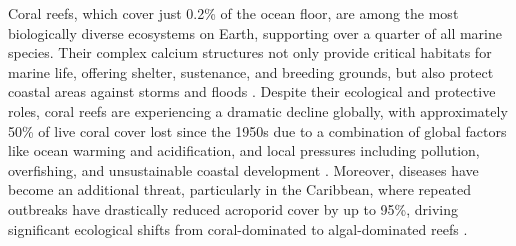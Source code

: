 \documentclass[preprint,12pt,authoryear]{elsarticle}
\begin{document}
Coral reefs, which cover just 0.2\% of the ocean floor, are among the most biologically diverse ecosystems on Earth, supporting over a quarter of all marine species. Their complex calcium structures not only provide critical habitats for marine life, offering shelter, sustenance, and breeding grounds, but also protect coastal areas against storms and floods \citep{Moberg1999, Spalding1997, Rogers2014May, Ferrario2014, Elliff2017Jun}. Despite their ecological and protective roles, coral reefs are experiencing a dramatic decline globally, with approximately 50\% of live coral cover lost since the 1950s due to a combination of global factors like ocean warming and acidification, and local pressures including pollution, overfishing, and unsustainable coastal development \citep{Eddy2021Sep}. Moreover, diseases have become an additional threat, particularly in the Caribbean, where repeated outbreaks have drastically reduced acroporid cover by up to 95\%, driving significant ecological shifts from coral-dominated to algal-dominated reefs \citep{richardson1998coral, sutherland2004disease, aronson2001white, harvell2007coral, brandt2009dynamics}.
\end{document}
